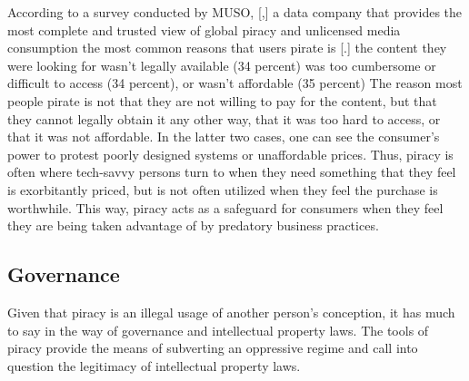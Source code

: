 \documentclass[onecolumn, 12pt]{article}
\begin{document}
\begin{refsection}
According to a survey conducted by MUSO, [,]{%
  a data company that provides the most complete and trusted view of global
  piracy and unlicensed media consumption%
} the most common reasons that users pirate is [.]{%
  the content they were looking for wasn’t legally available (34 percent) was
  too cumbersome or difficult to access (34 percent), or wasn’t affordable
  (35 percent)%
} The reason most people pirate is not that they are not willing to pay for the content,
but that they cannot legally obtain it any other way, that it was too hard to access, or
that it was not affordable. In the latter two cases, one can see the consumer's power to
protest poorly designed systems or unaffordable prices. Thus, piracy is often where
tech-savvy persons turn to when they need something that they feel is exorbitantly priced,
but is not often utilized when they feel the purchase is worthwhile. This way, piracy
acts as a safeguard for consumers when they feel they are being taken advantage of by
predatory business practices.

\subsection{Governance}
Given that piracy is an illegal usage of another person's conception, it has much to say
in the way of governance and intellectual property laws. The tools of piracy provide the
means of subverting an oppressive regime and call into question the legitimacy of
intellectual property laws.


\end{refsection}
\end{document}
